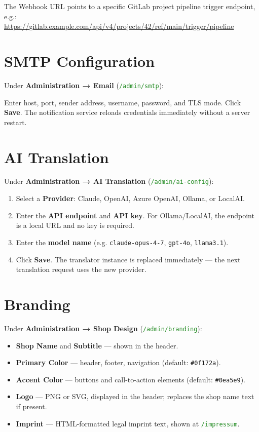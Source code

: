 \documentclass[12pt,a4paper,twoside]{report}
\newcommand{\notebox}[1]{\begin{tcolorbox}[noteboxstyle]#1\end{tcolorbox}}
\newcommand{\code}[1]{\texttt{#1}}
\newcommand{\route}[1]{\texttt{\textcolor{ForestGreen}{#1}}}
\begin{document}
\notebox{The Webhook URL points to a specific GitLab project pipeline
trigger endpoint, e.g.:\\
\url{https://gitlab.example.com/api/v4/projects/42/ref/main/trigger/pipeline}}

\section{SMTP Configuration}

Under \textbf{Administration → Email} (\route{/admin/smtp}):

Enter host, port, sender address, username, password, and TLS mode.
Click \textbf{Save}. The notification service reloads credentials
immediately without a server restart.

\section{AI Translation}
\label{sec:aitranslation}

Under \textbf{Administration → AI Translation} (\route{/admin/ai-config}):

\begin{enumerate}
  \item Select a \textbf{Provider}: Claude, OpenAI, Azure OpenAI,
        Ollama, or LocalAI.
  \item Enter the \textbf{API endpoint} and \textbf{API key}.
        For Ollama/LocalAI, the endpoint is a local URL and no key
        is required.
  \item Enter the \textbf{model name} (e.g. \code{claude-opus-4-7},
        \code{gpt-4o}, \code{llama3.1}).
  \item Click \textbf{Save}. The translator instance is replaced
        immediately — the next translation request uses the new provider.
\end{enumerate}

\section{Branding}
\label{sec:branding}

Under \textbf{Administration → Shop Design} (\route{/admin/branding}):

\begin{itemize}
  \item \textbf{Shop Name} and \textbf{Subtitle} — shown in the header.
  \item \textbf{Primary Color} — header, footer, navigation
        (default: \code{\#0f172a}).
  \item \textbf{Accent Color} — buttons and call-to-action elements
        (default: \code{\#0ea5e9}).
  \item \textbf{Logo} — PNG or SVG, displayed in the header; replaces
        the shop name text if present.
  \item \textbf{Imprint} — HTML-formatted legal imprint text, shown at
        \route{/impressum}.
\end{itemize}
\end{document}
